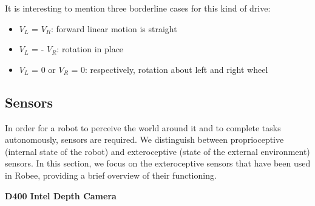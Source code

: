 It is interesting to mention three borderline cases for this kind of drive:
\begin{itemize}
    \item $V_{L}$ = $V_{R}$: forward linear motion is straight
    \item $V_{L}$ = - $V_{R}$: rotation in place
    \item $V_{L}$ = 0 or $V_{R}$ = 0: respectively, rotation about left and right wheel
\end{itemize}
\subsection{Sensors}
In order for a robot to perceive the world around it and to complete tasks autonomously, sensors are required. We distinguish between proprioceptive (internal state of the robot) and exteroceptive (state of the external environment) sensors. In this section, we focus on the exteroceptive sensors that have been used in Robee, providing a brief overview of their functioning.

\textbf{D400 Intel Depth Camera}

